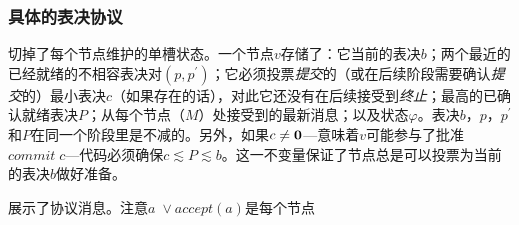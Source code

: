 \subsubsection{具体的表决协议}

切掉了每个节点维护的单槽状态。一个节点$v$存储了：它当前的表决$b$；两个最近的已经就绪的不相容表决对$(p,p^{\prime})$；它必须投票\textit{提交}的（或在后续阶段需要确认\textit{提交}的）最小表决$c$（如果存在的话），对此它还没有在后续接受到\textit{终止}；最高的已确认就绪表决$P$；从每个节点（$M$）处接受到的最新消息；以及状态$\varphi$。表决$b$，$p$，$p^{\prime}$和$P$在同一个阶段里是不减的。另外，如果$c\neq{\bm 0}$---意味着$v$可能参与了批准$commit\;c$---代码必须确保$c\lesssim P\lesssim b$。这一不变量保证了节点总是可以投票为当前的表决$b$做好准备。

展示了协议消息。注意$a\;\vee accept(a)$是每个节点